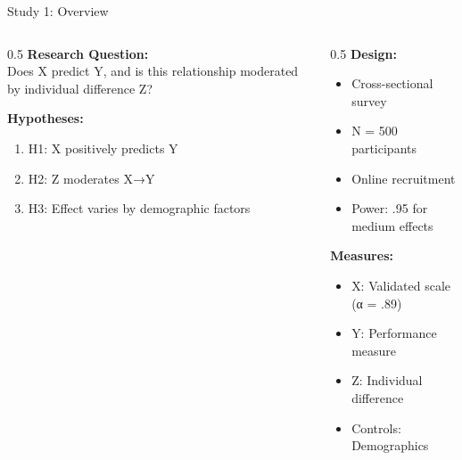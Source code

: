 \documentclass[aspectratio=169,12pt]{beamer}
\begin{document}
\begin{frame}{Study 1: Overview}
  \begin{columns}[T]

    \begin{column}{0.5\textwidth}
      \textbf{Research Question:}\\
      Does X predict Y, and is this relationship moderated by individual difference Z?

      \vspace{0.5cm}

      \textbf{Hypotheses:}
      \begin{enumerate}
        \item H1: X positively predicts Y
        \item H2: Z moderates X→Y
        \item H3: Effect varies by demographic factors
      \end{enumerate}
    \end{column}

    \begin{column}{0.5\textwidth}
      \textbf{Design:}
      \begin{itemize}
        \item Cross-sectional survey
        \item N = 500 participants
        \item Online recruitment
        \item Power: .95 for medium effects
      \end{itemize}

      \vspace{0.3cm}

      \textbf{Measures:}
      \begin{itemize}
        \item X: Validated scale (α = .89)
        \item Y: Performance measure
        \item Z: Individual difference
        \item Controls: Demographics
      \end{itemize}
    \end{column}

  \end{columns}
\end{frame}
\end{document}
